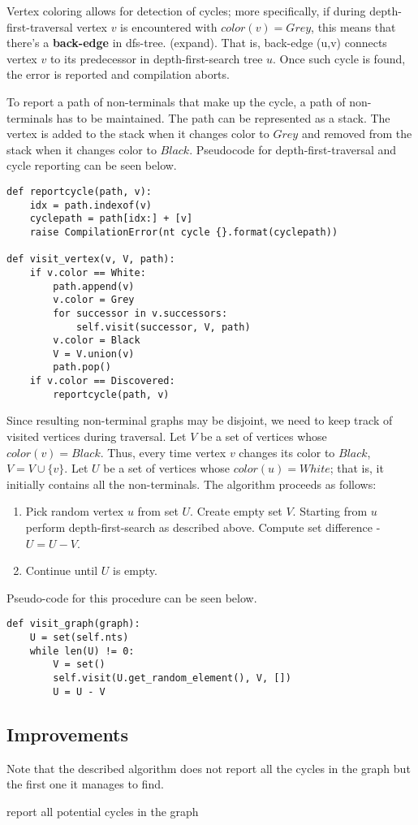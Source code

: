 Vertex coloring allows for detection of cycles; more specifically, if during depth-first-traversal vertex $v$ is encountered with $color(v)=Grey$, this means that there's a \textbf{back-edge} in dfs-tree. (expand). That is, back-edge (u,v) connects vertex $v$ to its predecessor in depth-first-search tree $u$. Once such cycle is found, the error is reported and compilation aborts.

To report a path of non-terminals that make up the cycle, a path of non-terminals has to be maintained. The path can be represented as a stack. The vertex is added to the stack when it changes color to $Grey$ and removed from the stack when it changes color to $Black$. Pseudocode for depth-first-traversal and cycle reporting can be seen below.

\begin{lstlisting}
def reportcycle(path, v):
	idx = path.indexof(v)
	cyclepath = path[idx:] + [v]
	raise CompilationError(nt cycle {}.format(cyclepath))

def visit_vertex(v, V, path):
	if v.color == White:
		path.append(v)
		v.color = Grey 
		for successor in v.successors:
			self.visit(successor, V, path)
		v.color = Black
		V = V.union(v)
		path.pop()
	if v.color == Discovered:
		reportcycle(path, v)
\end{lstlisting}

Since resulting non-terminal graphs may be disjoint, we need to keep track of visited vertices during traversal. Let $V$ be a set of vertices whose $color(v)=Black$. Thus, every time vertex $v$ changes its color to $Black$, $V = V \cup \{v\} $. Let $U$ be a set of vertices whose $color(u)=White$; that is, it initially contains all the non-terminals. The algorithm proceeds as follows:

\begin{enumerate}
\item
Pick random vertex $u$ from set $U$. Create empty set $V$. Starting from $u$ perform depth-first-search as described above. Compute set difference - $U = U-V$.
\item
Continue until $U$ is empty.
\end{enumerate}

Pseudo-code for this procedure can be seen below.

\begin{lstlisting}
def visit_graph(graph):
	U = set(self.nts)
	while len(U) != 0:
		V = set()
		self.visit(U.get_random_element(), V, [])
		U = U - V
\end{lstlisting}

\subsection{Improvements}
Note that the described algorithm does not report all the cycles in the graph but the first one it manages to find.

report all potential cycles in the graph
